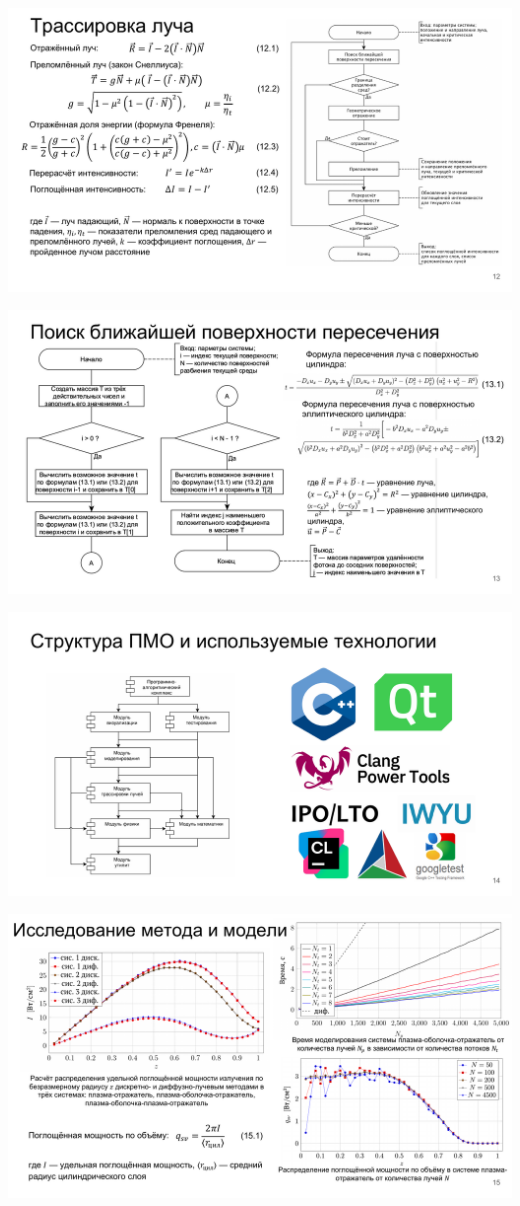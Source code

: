 \includegraphics[angle=90,origin=c]{inc/img/presentation-12}

\includegraphics[angle=90,origin=c]{inc/img/presentation-13}

\includegraphics[angle=90,origin=c]{inc/img/presentation-14}

\includegraphics[angle=90,origin=c]{inc/img/presentation-15}

